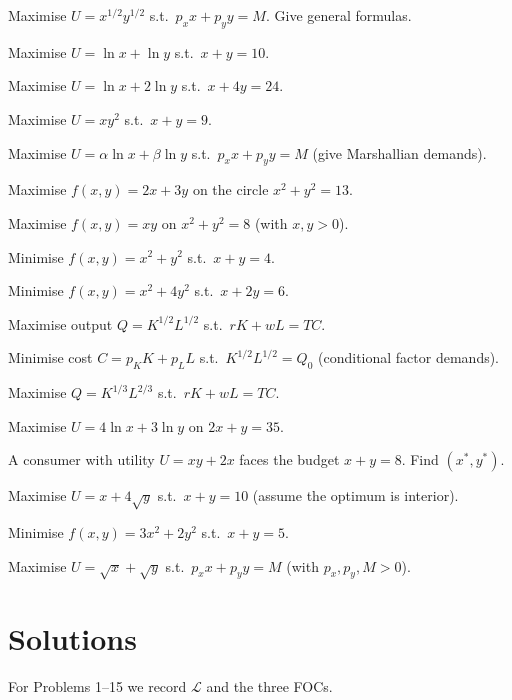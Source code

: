\begin{problems}
  \item Maximise $U = x^{1/2} y^{1/2}$ s.t.\ $p_x x + p_y y = M$. Give general formulas.
  \item Maximise $U = \ln x + \ln y$ s.t.\ $x + y = 10$.
  \item Maximise $U = \ln x + 2 \ln y$ s.t.\ $x + 4 y = 24$.
  \item Maximise $U = x y^2$ s.t.\ $x + y = 9$.
  \item Maximise $U = \alpha \ln x + \beta \ln y$ s.t.\ $p_x x + p_y y = M$ (give Marshallian demands).
  \item Maximise $f(x, y) = 2 x + 3 y$ on the circle $x^2 + y^2 = 13$.
  \item Maximise $f(x, y) = x y$ on $x^2 + y^2 = 8$ (with $x, y > 0$).
  \item Minimise $f(x, y) = x^2 + y^2$ s.t.\ $x + y = 4$.
  \item Minimise $f(x, y) = x^2 + 4 y^2$ s.t.\ $x + 2 y = 6$.
  \item Maximise output $Q = K^{1/2} L^{1/2}$ s.t.\ $r K + w L = TC$.
  \item Minimise cost $C = p_K K + p_L L$ s.t.\ $K^{1/2} L^{1/2} = Q_0$ (conditional factor demands).
  \item Maximise $Q = K^{1/3} L^{2/3}$ s.t.\ $r K + w L = TC$.
  \item Maximise $U = 4 \ln x + 3 \ln y$ on $2 x + y = 35$.
  \item A consumer with utility $U = x y + 2 x$ faces the budget $x + y = 8$. Find $(x^*, y^*)$.
  \item Maximise $U = x + 4 \sqrt{y}$ s.t.\ $x + y = 10$ (assume the optimum is interior).
  \item Minimise $f(x, y) = 3 x^2 + 2 y^2$ s.t.\ $x + y = 5$.
  \item Maximise $U = \sqrt{x} + \sqrt{y}$ s.t.\ $p_x x + p_y y = M$ (with $p_x, p_y, M > 0$).
\end{problems}

\section{Solutions}

For Problems 1--15 we record $\mathcal{L}$ and the three FOCs.

